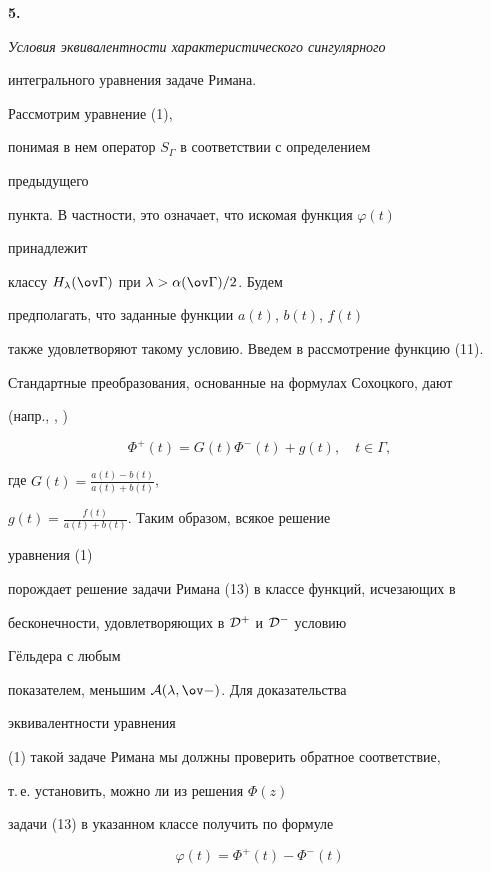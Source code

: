 \medskip





{\bf 5.} {\it Условия эквивалентности характеристического сингулярного


интегрального уравнения задаче Римана.} Рассмотрим уравнение (1),


понимая в нем оператор $S_\Gamma$ в соответствии с определением


предыдущего


пункта. В частности, это означает, что искомая функция $\varphi(t)$


принадлежит


классу $H_\lambda(\ov\Gamma)$ при $\lambda>\alpha(\ov\Gamma)/2$. Будем


предполагать, что заданные функции $a(t)$, $b(t)$, $f(t)$


также удовлетворяют такому условию. Введем в рассмотрение функцию (11).


Стандартные преобразования, основанные на формулах Сохоцкого, дают


(напр., \cite{1}, \cite{2})


\begin{equation}


\Phi^+(t)=G(t)\Phi^-(t)+g(t),\quad t\in\Gamma,


\end{equation}


где $G(t)=\frac{a(t)-b(t)}{a(t)+b(t)}$,


$g(t)=\frac{f(t)}{a(t)+b(t)}$. Таким образом, всякое решение


уравнения (1)


порождает решение задачи Римана (13) в классе функций, исчезающих в


бесконечности, удовлетворяющих в $\cal D^+$ и $\cal D^-$ условию


Г\"ельдера с любым


показателем, меньшим $\cal A(\lambda,\ov\Gamma)$. Для доказательства


эквивалентности уравнения


(1) такой задаче Римана мы должны проверить обратное соответствие,


т.\,е. установить, можно ли из решения $\Phi(z)$


задачи (13) в указанном классе получить по формуле


$$


\varphi(t)=\Phi^+(t)-\Phi^-(t)


$$


